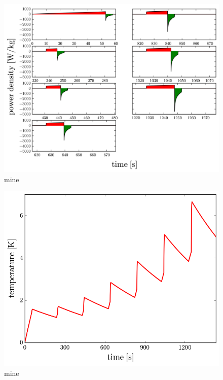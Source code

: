 \documentclass[10pt, oneside]{article}   	%
\begin{document}
\begin{figure}[h!]
    \centering
    \includegraphics[width=\textwidth]{figures/constant_current_charge_constant_voltage_discharge_power_density}
    \caption{mine}
    \label{fig:constant_current_charge_constant_voltage_discharge_current_and_voltage}
\end{figure}

\begin{figure}[h!]
    \centering
    \includegraphics[width=\textwidth]{figures/constant_current_charge_constant_voltage_discharge_temperature}
    \caption{mine}
    \label{fig:constant_current_charge_constant_voltage_discharge_temperature}
\end{figure}
\end{document}
